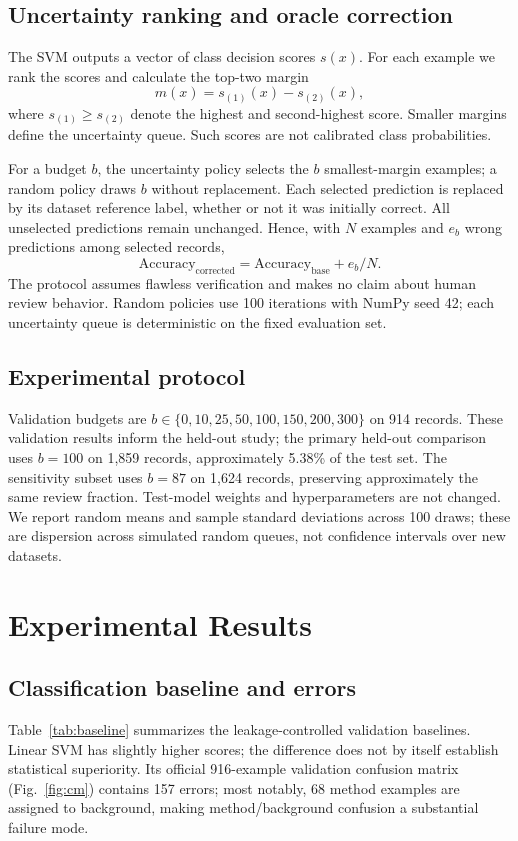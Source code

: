 \documentclass[11pt]{article}
\begin{document}
\subsection{Uncertainty ranking and oracle correction}
The SVM outputs a vector of class decision scores $s(x)$. For each example we rank the scores and calculate the top-two margin
\begin{equation}\label{eq:margin}
 m(x)=s_{(1)}(x)-s_{(2)}(x),
\end{equation}
where $s_{(1)}\ge s_{(2)}$ denote the highest and second-highest score. Smaller margins define the uncertainty queue. Such scores are not calibrated class probabilities.

For a budget $b$, the uncertainty policy selects the $b$ smallest-margin examples; a random policy draws $b$ without replacement. Each selected prediction is replaced by its dataset reference label, whether or not it was initially correct. All unselected predictions remain unchanged. Hence, with $N$ examples and $e_b$ wrong predictions among selected records,
\begin{equation}\label{eq:accuracy}
 \mathrm{Accuracy}_{\mathrm{corrected}}=\mathrm{Accuracy}_{\mathrm{base}}+e_b/N.
\end{equation}
The protocol assumes flawless verification and makes no claim about human review behavior. Random policies use 100 iterations with NumPy seed 42; each uncertainty queue is deterministic on the fixed evaluation set.

\subsection{Experimental protocol}
Validation budgets are $b\in\{0,10,25,50,100,150,200,300\}$ on 914 records. These validation results inform the held-out study; the primary held-out comparison uses $b=100$ on 1,859 records, approximately 5.38\% of the test set. The sensitivity subset uses $b=87$ on 1,624 records, preserving approximately the same review fraction. Test-model weights and hyperparameters are not changed. We report random means and sample standard deviations across 100 draws; these are dispersion across simulated random queues, not confidence intervals over new datasets.

\section{Experimental Results}
\subsection{Classification baseline and errors}
Table~\ref{tab:baseline} summarizes the leakage-controlled validation baselines. Linear SVM has slightly higher scores; the difference does not by itself establish statistical superiority. Its official 916-example validation confusion matrix (Fig.~\ref{fig:cm}) contains 157 errors; most notably, 68 method examples are assigned to background, making method/background confusion a substantial failure mode.
\end{document}
